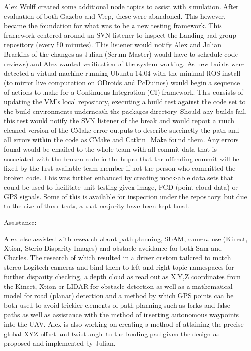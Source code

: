 \begin{enumerate}
Alex Wulff created some additional node topics to assist with simulation. After evaluation of both Gazebo and Vrep, these were abandoned.  This however, became the foundation for what was to be a new testing framework.  This framework centered around an SVN listener to inspect the Landing pad group repository (every 50 minutes).  This listener would notify Alex and Julian Brackins of the changes as Julian (Scrum Master) would have to schedule code reviews) and Alex wanted verification of the system working. 
As new builds were detected a virtual machine running Ubuntu 14.04 with the minimal ROS install (to mirror live computation on ODroids and PcDuinos) would begin a sequence of actions to make for a Continuous Integration (CI) framework.  This consists of updating the VM’s local repository, executing a build test against the code set to the build environments underneath the packages directory.  Should any builds fail, this test would notify the SVN listener of the break and would report a much cleaned version of the CMake error outputs to describe succinctly the path and all errors within the code as CMake and Catkin\_Make found them.  Any errors found would be emailed to the whole team with all commit data that is associated with the broken code in the hopes that the offending commit will be fixed by the first available team member if not the person who committed the broken code.
This was further enhanced by creating mock-able data sets that could be used to facilitate unit testing given image, PCD (point cloud data) or GPS signals.  Some of this is available for inspection under the repository, but due to the size of these tests, a vast majority have been kept local.

Assistance:

Alex also assisted with research about path planning, SLAM, camera use (Kinect, Xtion, Sterio-Disparity Images) and obstacle avoidance for both Sam and Charles. The research of which resulted in a driver custom tailored to match stereo Logitech cameras and bind them to left and right topic namespaces for further disparity checking, a depth cloud as read out as X,Y,Z coordinates from the Kinect, Xtion or LIDAR for obstacle detection as well as a mathematical model for road (planar) detection and a method by which GPS points can be both used to avoid trickier elements of path planning such as forks and false paths as well as assistance with the method of inserting autonomous waypoints into the UAV.  Alex is also working on creating a method of attaining the precise global XYZ offset and twist angle to the landing pad given the design as proposed and implemented by Julian.


\end{enumerate}
